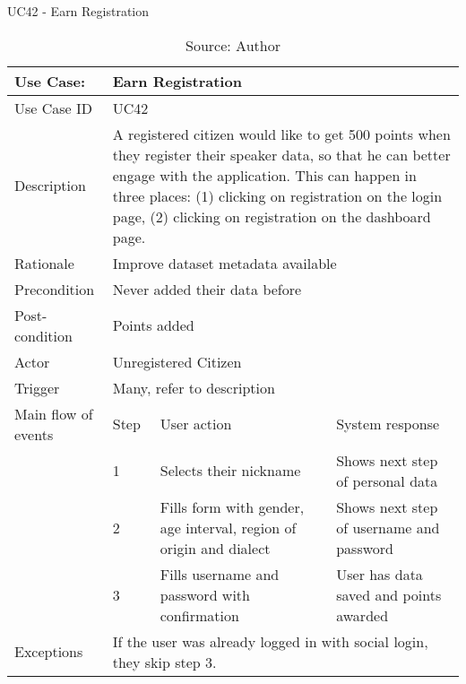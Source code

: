 \begin{table}[h]
\centering
\caption{UC42 - Earn Registration}
\label{uc:42}
\begin{tabular}{|p{3cm}|p{1cm}|p{5cm}|p{5cm}|}
\hline
Use Case:       & \multicolumn{3}{p{11cm}|}{Earn Registration} \\ \hline
Use Case ID     & \multicolumn{3}{p{11cm}|}{UC42} \\ \hline
Description     & \multicolumn{3}{p{11cm}|}{A registered citizen would like to get 500 points when they register their speaker data, so that he can better engage with the application. This can happen in three places: (1) clicking on registration on the login page, (2) clicking on registration on the dashboard page.} \\ \hline
Rationale       & \multicolumn{3}{p{11cm}|}{Improve dataset metadata available} \\ \hline
Precondition    & \multicolumn{3}{p{11cm}|}{Never added their data before} \\ \hline
Post-condition  & \multicolumn{3}{p{11cm}|}{Points added} \\ \hline
Actor           & \multicolumn{3}{p{11cm}|}{Unregistered Citizen} \\ \hline
Trigger         & \multicolumn{3}{p{11cm}|}{Many, refer to description} \\ \hline
Main flow of events & Step  & User action & System response \\ \hline
                    & 1     & Selects their nickname & Shows next step of personal data \\ \hline
                    & 2     & Fills form with gender, age interval, region of origin and dialect & Shows next step of username and password \\ \hline
                    & 3     & Fills username and password with confirmation & User has data saved and points awarded \\ \hline
Exceptions      & \multicolumn{3}{p{11cm}|}{If the user was already logged in with social login, they skip step 3.} \\ \hline
\end{tabular}
\caption*{Source: Author}
\end{table}

